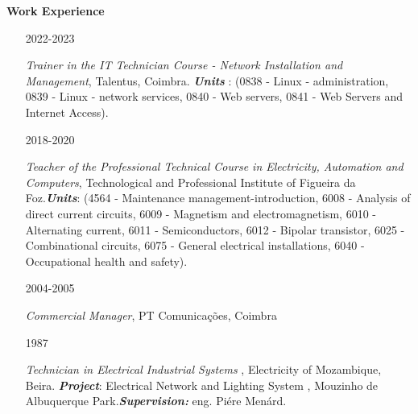 \documentclass[10pt,a4paper,oneside]{article}
\newlength{\datewidth}
\newlength{\textindent}
\begin{document}
	\vspace{5mm}
	\textbf{\hspace{\textindent}Work Experience}
	\begin{itemize}
		\item[\hspace{\datewidth}\scriptsize 2022-2023] \parbox[t]{\dimexpr\linewidth-\datewidth-\textindent}{\textit{Trainer in the IT Technician Course - Network Installation and Management}, Talentus, Coimbra. \textbf{\textit{Units }}: (0838 - Linux - administration,  0839 - Linux - network services, 0840 - Web servers, 0841 - Web Servers and Internet Access).}
		\item[\hspace{\datewidth}\scriptsize 2018-2020] \parbox[t]{\dimexpr\linewidth-\datewidth-\textindent}{\textit{Teacher of the Professional Technical Course in Electricity, Automation and Computers}, Technological and Professional Institute of Figueira da Foz.\textbf{\textit{Units}}: (4564 - Maintenance management-introduction, 6008 - Analysis of direct current circuits, 6009 - Magnetism and electromagnetism, 6010 - Alternating current,  6011 - Semiconductors, 6012 - Bipolar transistor,  6025 - Combinational circuits,  6075 - General electrical installations, 6040 - Occupational health and safety).}
		\item[\hspace{\datewidth}\scriptsize 2004-2005] \parbox[t]{\dimexpr\linewidth-\datewidth-\textindent}{\textit{Commercial Manager},  PT Comunicações, Coimbra}
		\item[\hspace{\datewidth}\scriptsize 1987] \parbox[t]{\dimexpr\linewidth-\datewidth-\textindent}{\textit{Technician in Electrical Industrial Systems },  Electricity of Mozambique, Beira. \textbf{\textit{Project}}:  Electrical Network and Lighting System , Mouzinho de Albuquerque Park.\textbf{\textit{Supervision:}} eng. Piére Menárd.}
	\end{itemize}
	
\end{document}
